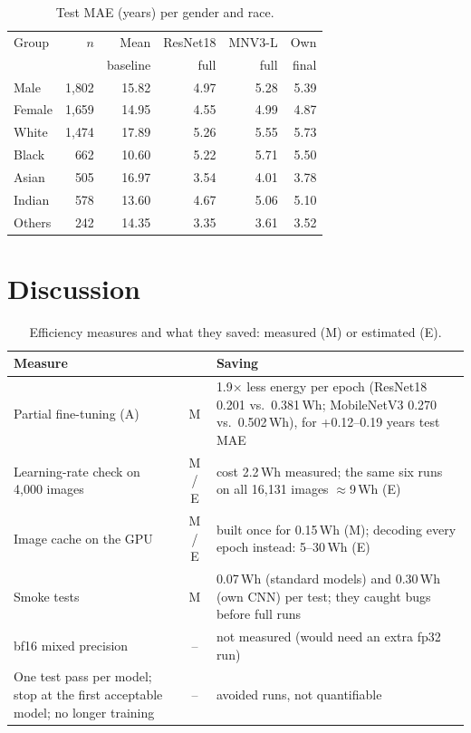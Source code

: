 \documentclass[conference,a4paper]{IEEEtran}
\begin{document}
\begin{table}[t]
\caption{Test MAE (years) per gender and race.}
\label{tab:groups}
\centering\footnotesize
\setlength{\tabcolsep}{3.5pt}
\begin{tabular}{@{}lrrrrr@{}}
\toprule
Group & $n$ & Mean & ResNet18 & MNV3-L & Own \\
 & & baseline & full & full & final \\
\midrule
Male & 1{,}802 & 15.82 & 4.97 & 5.28 & 5.39 \\
Female & 1{,}659 & 14.95 & 4.55 & 4.99 & 4.87 \\
\midrule
White & 1{,}474 & 17.89 & 5.26 & 5.55 & 5.73 \\
Black & 662 & 10.60 & 5.22 & 5.71 & 5.50 \\
Asian & 505 & 16.97 & 3.54 & 4.01 & 3.78 \\
Indian & 578 & 13.60 & 4.67 & 5.06 & 5.10 \\
Others & 242 & 14.35 & 3.35 & 3.61 & 3.52 \\
\bottomrule
\end{tabular}
\end{table}

\section{Discussion}
\begin{table}[t]
\caption{Efficiency measures and what they saved: measured (M) or estimated (E).}
\label{tab:savings}
\centering\scriptsize
\setlength{\tabcolsep}{3pt}
\begin{tabular}{@{}p{2.6cm}cp{4.9cm}@{}}
\toprule
Measure & & Saving \\
\midrule
Partial fine-tuning (A) & M & 1.9$\times$ less energy per epoch (ResNet18 0.201 vs.\ 0.381\,Wh; MobileNetV3 0.270 vs.\ 0.502\,Wh), for +0.12--0.19 years test MAE \\
Learning-rate check on 4{,}000 images & M / E & cost 2.2\,Wh measured; the same six runs on all 16{,}131 images $\approx$9\,Wh (E) \\
Image cache on the GPU & M / E & built once for 0.15\,Wh (M); decoding every epoch instead: 5--30\,Wh (E) \\
Smoke tests & M & 0.07\,Wh (standard models) and 0.30\,Wh (own CNN) per test; they caught bugs before full runs \\
bf16 mixed precision & -- & not measured (would need an extra fp32 run) \\
One test pass per model; stop at the first acceptable model; no longer training & -- & avoided runs, not quantifiable \\
\bottomrule
\end{tabular}
\end{table}
\end{document}
